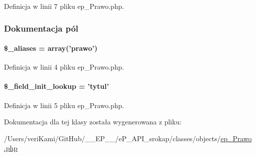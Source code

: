 Definicja w linii 7 pliku ep\-\_\-\-Prawo.\-php.



\subsubsection{Dokumentacja pól}
\hypertarget{classep___prawo_ab4e31d75f0bc5d512456911e5d01366b}{
\paragraph[{\$\-\_\-aliases}]{\setlength{\rightskip}{0pt plus 5cm}\$\-\_\-aliases = array('prawo')}}\label{classep___prawo_ab4e31d75f0bc5d512456911e5d01366b}


Definicja w linii 4 pliku ep\-\_\-\-Prawo.\-php.

\hypertarget{classep___prawo_a4a4d54ae35428077a7c61ec8a5139af3}{
\paragraph[{\$\-\_\-field\-\_\-init\-\_\-lookup}]{\setlength{\rightskip}{0pt plus 5cm}\$\-\_\-field\-\_\-init\-\_\-lookup = 'tytul'}}\label{classep___prawo_a4a4d54ae35428077a7c61ec8a5139af3}


Definicja w linii 5 pliku ep\-\_\-\-Prawo.\-php.



Dokumentacja dla tej klasy została wygenerowana z pliku\-:\begin{DoxyCompactItemize}
\item 
/\-Users/veri\-Kami/\-Git\-Hub/\-\_\-\-\_\-\-E\-P\-\_\-\-\_\-/e\-P\-\_\-\-A\-P\-I\-\_\-srokap/classes/objects/\hyperlink{ep___prawo_8php}{ep\-\_\-\-Prawo.\-php}\end{DoxyCompactItemize}
